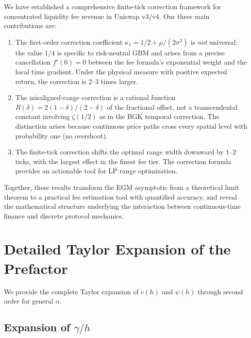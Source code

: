 \documentclass[11pt]{article}
\theoremstyle{definition}
\theoremstyle{remark}
\begin{document}
We have established a comprehensive finite-tick correction framework
for concentrated liquidity fee revenue in Uniswap v3/v4. Our three
main contributions are:

\begin{enumerate}[label=(\arabic*)]
\item The first-order correction coefficient
$\kappa_1 = 1/2 + \mu/(2\sigma^2)$ is \emph{not} universal: the
value $1/4$ is specific to risk-neutral GBM and arises from a
precise cancellation $f'(0) = 0$ between the fee formula's
exponential weight and the local time gradient. Under the physical
measure with positive expected return, the correction is $2$--$3$
times larger.

\item The misaligned-range correction is a rational function
$R(\delta) = 2(1-\delta)/(2-\delta)$ of the fractional offset, not a
transcendental constant involving $\zeta(1/2)$ as in the BGK
temporal correction. The distinction arises because continuous price
paths cross every spatial level with probability one (no overshoot).

\item The finite-tick correction shifts the optimal range width
downward by $1$--$2$ ticks, with the largest effect in the finest
fee tier. The correction formula provides an actionable tool for LP
range optimization.
\end{enumerate}

Together, these results transform the EGM asymptotic from a
theoretical limit theorem to a practical fee estimation tool with
quantified accuracy, and reveal the mathematical structure underlying
the interaction between continuous-time finance and discrete protocol
mechanics.


\appendix

\section{Detailed Taylor Expansion of the Prefactor}
\label{app:taylor}

We provide the complete Taylor expansion of $c(h)$ and $\psi(h)$
through second order for general $\alpha$.

\subsection{Expansion of $\gamma/h$}
\end{document}
